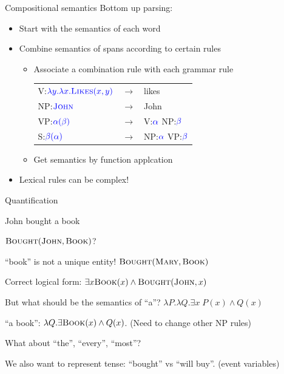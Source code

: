 \documentclass[usenames,dvipsnames,notes]{beamer}
\begin{document}
\begin{frame}
    {Compositional semantics}
    Bottom up parsing:\\
    \begin{itemize}
        \item Start with the semantics of each word
        \item Combine semantics of spans according to certain rules 
            \begin{itemize}
                \item Associate a combination rule with each grammar rule
                    \begin{table}
                        \begin{tabular}{lll}
                            V:${\color{blue}\lambda y.\lambda x.\textsc{Likes}(x,y)}$ & $\rightarrow$ & likes\\
                            NP:${\color{blue}\textsc{John}}$ &$\rightarrow$& John\\ 
                            VP:${\color{blue}\alpha(\beta)}$ &$\rightarrow$& V:${\color{blue}\alpha}$ NP:${\color{blue}\beta}$\\
                            S:${\color{blue}\beta(\alpha)}$ &$\rightarrow$& NP:${\color{blue}\alpha}$ VP:${\color{blue}\beta}$
                        \end{tabular}
                    \end{table}
                \item Get semantics by function applcation
            \end{itemize}
        \item Lexical rules can be complex!
    \end{itemize}
\end{frame}

\begin{frame}
    {Quantification}
    \vspace{2em}
    \begin{center}
        John bought a book
    \end{center}
    \vspace{-1em}
    $\textsc{Bought}(\textsc{John}, \textsc{Book})$?

    \pause
    ``book'' is not a unique entity! $\textsc{Bought}(\textsc{Mary}, \textsc{Book})$

    Correct logical form: $\exists x \textsc{Book}(x) \land \textsc{Bought}(\textsc{John}, x)$

    But what should be the semantics of ``a''? $\lambda P.\lambda Q. \exists x\; P(x) \land Q(x)$

    ``a book'': $\lambda Q. \exists \textsc{Book}(x) \land Q(x)$. (Need to change other NP rules)

    What about ``the'', ``every'', ``most''? 

    We also want to represent tense: ``bought'' vs ``will buy''. (event variables)
\end{frame}
\end{document}
